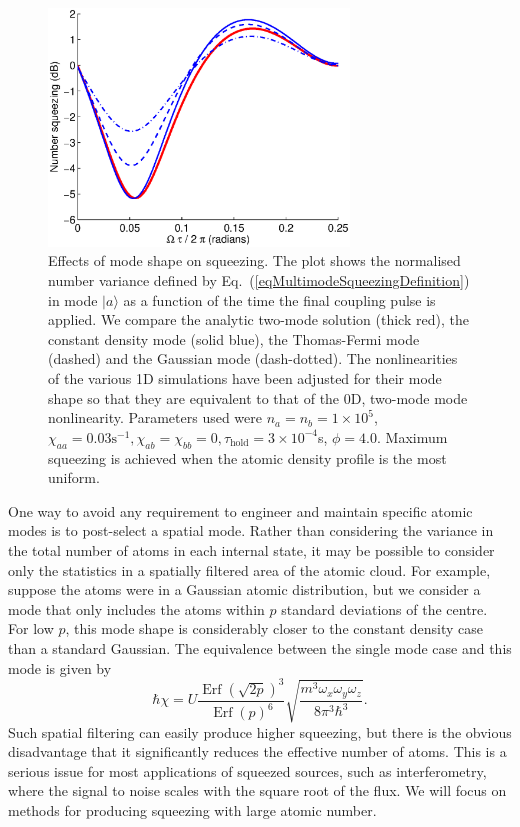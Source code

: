 \documentclass{iopart}
\DeclareMathOperator{\erf}{Erf}
\begin{document}
\begin{figure}
    \centering
    \includegraphics[width=8cm]{figures/modal_squeezing_effects_1D.eps}
    \caption{Effects of mode shape on squeezing. The plot shows the normalised number variance defined by Eq.~(\ref{eqMultimodeSqueezingDefinition}) in mode $|a \rangle$ as a function of the time the final coupling pulse is applied. We compare the analytic two-mode solution (thick red), the constant density mode (solid blue), the Thomas-Fermi mode (dashed) and the Gaussian mode (dash-dotted). The nonlinearities of the various 1D simulations have been adjusted for their mode shape so that they are equivalent to that of the 0D, two-mode mode nonlinearity. Parameters used were $n_a = n_b =1 \times 10^5$, $\chi_{aa}=0.03 \text{s}^{-1}, \chi_{ab}=\chi_{bb}=0, \tau_{\mathrm{hold}}=3\times 10^{-4}$s, $\phi=4.0$. Maximum squeezing is achieved when the atomic density profile is the most uniform.}
    \label{figModalSqueezingEffects1D}
\end{figure}

One way to avoid any requirement to engineer and maintain specific atomic modes is to post-select a spatial mode.  Rather than considering the variance in the total number of atoms in each internal state, it may be possible to consider only the statistics in a spatially filtered area of the atomic cloud.  For example, suppose the atoms were in a Gaussian atomic distribution, but we consider a mode that only includes the atoms within $p$ standard deviations of the centre. For low $p$, this mode shape is considerably closer to the constant density case than a standard Gaussian. The equivalence between the single mode case and this mode is given by
\begin{equation}
\hbar\chi = U \frac{\erf (\sqrt{2p})^3}{\erf(p)^6} \sqrt{\frac{m^3 \omega_x \omega_y \omega_z}{8 \pi^3 \hbar^3}}.
\end{equation}
Such spatial filtering can easily produce higher squeezing, but there is the obvious disadvantage that it  significantly reduces the effective number of atoms.  This is a serious issue for most applications of squeezed sources, such as interferometry, where the signal to noise scales with the square root of the flux.  We will focus on methods for producing squeezing with large atomic number.
\end{document}
